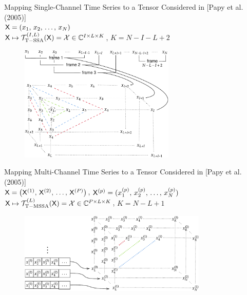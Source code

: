 \documentclass[pdf, unicode, ucs, notheorems]{beamer}
\theoremstyle{definition}
\begin{document}
\begin{frame}{Mapping Single-Channel Time Series to a Tensor}
  Considered in [Papy et al. (2005)]\\ \smallskip
  $\mathsf{X} = (x_1,\, x_2,\, \ldots,\, x_N)$\\ \smallskip
  $\mathsf{X} \mapsto \mathcal{T}_{\mathrm{T-SSA}}^{(I, L)}(\mathsf{X}) = \mathcal{X} \in
  \mathbb{C}^{I\times L \times K}$, $K = N - I - L + 2$

  \begin{figure}[!ht]
    \centering
    \includegraphics[width=0.66\textwidth]{tens-injection-wide.pdf}
  \end{figure}
\end{frame}

\begin{frame}{Mapping Multi-Channel Time Series to a Tensor}
  Considered in [Papy et al. (2005)]\\ \smallskip
  $\mathsf{X} = \left(\mathsf{X}^{(1)},\, \mathsf{X}^{(2)},\, \ldots,\,
  \mathsf{X}^{(P)}\right)$, $\mathsf{X}^{(p)} = (x_1^{(p)},\, x_2^{(p)},\,
  \ldots,\, x_N^{(p)})$\\ \medskip
  $\mathsf{X} \mapsto \mathcal{T}_{\mathrm{T-MSSA}}^{(L)}(\mathsf{X})
  = \mathcal{X} \in \mathbb{C}^{P\times L \times K}$, $K = N - L + 1$

  \bigskip

  \begin{figure}[!ht]
    \centering
    \includegraphics[width=0.8\textwidth]{mssa_injection_new.pdf}
  \end{figure}
\end{frame}
\end{document}
